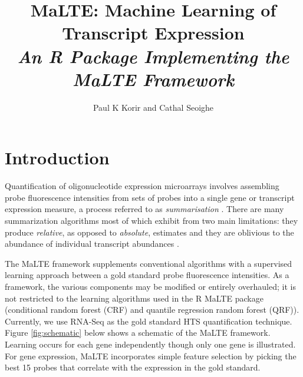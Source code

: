 \documentclass[a4paper,12pt]{article}
\author{Paul K Korir and Cathal Seoighe}
\title{\textbf{MaLTE: Machine Learning of Transcript Expression}\\\textit{An \textsf{R} Package Implementing the MaLTE Framework}}
\date{}
\begin{document}
\maketitle

\newpage

\tableofcontents

\newpage


\section{Introduction}
\label{introduction}
Quantification of oligonucleotide expression microarrays involves assembling probe fluorescence intensities from sets of probes into a single gene or transcript expression measure, a process referred to as \textit{summarisation} \cite{irizarry2003summaries}. There are many summarization algorithms \cite{irizarry2006comparison} most of which exhibit from two main limitations: they produce \textit{relative}, as opposed to \textit{absolute}, estimates \cite{irizarry2005multiple, fu2009estimating} and they are oblivious to the abundance of individual transcript abundances \cite{malone2011microarrays}. 

The \textsf{MaLTE} framework supplements conventional algorithms with a supervised learning approach between a gold standard probe fluorescence intensities. As a framework, the various components may be modified or entirely overhauled; it is not restricted to the learning algorithms used in the \textsf{R} \textsf{MaLTE} package (conditional random forest (CRF) and quantile regression random forest (QRF)). Currently, we use RNA-Seq as the gold standard HTS quantification technique. Figure \ref{fig:schematic} below shows a schematic of the \textsf{MaLTE} framework. Learning occurs for each gene independently though only one gene is illustrated. For gene expression, \textsf{MaLTE} incorporates simple feature selection by picking the best 15 probes that correlate with the expression in the gold standard.
\end{document}
